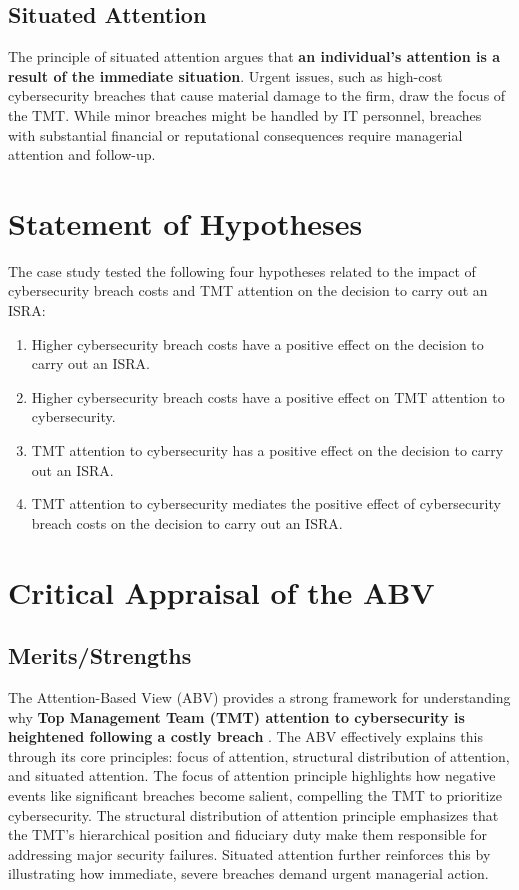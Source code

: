     \subsection{Situated Attention}
    The principle of situated attention argues that \textbf{an individual’s attention is a result of the immediate situation}. Urgent issues, such as high-cost cybersecurity breaches that cause material damage to the firm, draw the focus of the TMT. While minor breaches might be handled by IT personnel, breaches with substantial financial or reputational consequences require managerial attention and follow-up.

\section{Statement of Hypotheses}
The case study tested the following four hypotheses related to the impact of cybersecurity breach costs and TMT attention on the decision to carry out an ISRA:
\begin{enumerate}
    \item Higher cybersecurity breach costs have a positive effect on the decision to carry out an ISRA.
    \item Higher cybersecurity breach costs have a positive effect on TMT attention to cybersecurity.
    \item TMT attention to cybersecurity has a positive effect on the decision to carry out an ISRA.
    \item TMT attention to cybersecurity mediates the positive effect of cybersecurity breach costs on the decision to carry out an ISRA.
\end{enumerate}

\section{Critical Appraisal of the ABV}

    \subsection{Merits/Strengths}
    The Attention-Based View (ABV) provides a strong framework for understanding why \textbf{Top Management Team (TMT) attention to cybersecurity is heightened following a costly breach} \citep{shaikh2023information}. The ABV effectively explains this through its core principles: focus of attention, structural distribution of attention, and situated attention. The focus of attention principle highlights how negative events like significant breaches become salient, compelling the TMT to prioritize cybersecurity. The structural distribution of attention principle emphasizes that the TMT's hierarchical position and fiduciary duty make them responsible for addressing major security failures. Situated attention further reinforces this by illustrating how immediate, severe breaches demand urgent managerial action.

